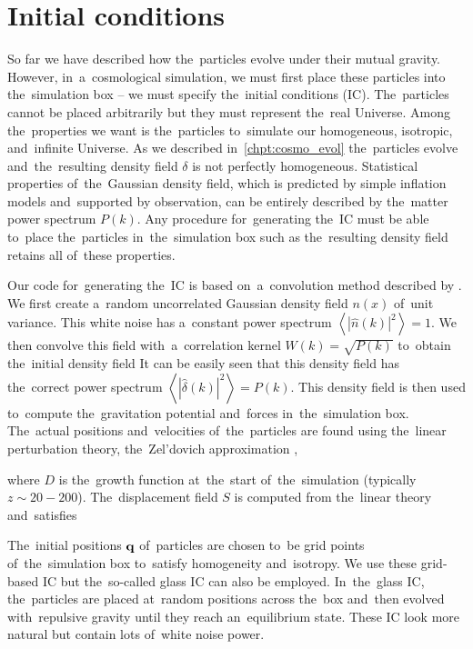 \section{Initial conditions}
So far we have described how the~particles evolve under their mutual gravity. However, in~a~cosmological simulation, we must first place these particles into the~simulation box -- we must specify the~initial conditions (IC). The~particles cannot be placed arbitrarily but they must represent the~real Universe. Among the~properties we want is the~particles to~simulate our homogeneous, isotropic, and~infinite Universe. As we described in~\autoref{chpt:cosmo_evol} the~particles evolve and~the~resulting density field $\delta$ is not perfectly homogeneous. Statistical properties of~the~Gaussian density field, which is predicted by simple inflation models and~supported by observation, can be entirely described by the~matter power spectrum $P(k)$. Any procedure for~generating the~IC must be able to~place the~particles in~the~simulation box such as the~resulting density field retains all of~these properties.

Our code for~generating the~IC is based on~a~convolution method described by \textcite{1997ApJ...490L.127P}. We first create a~random uncorrelated Gaussian density field $n(x)$ of~unit variance. This white noise has a~constant power spectrum $\left\langle|\hat n(k)|^2\right\rangle=1$. We then convolve this field with~a~correlation kernel $W(k)=\sqrt{P(k)}$ to~obtain the~initial  density field
It can be easily seen that this density field has the~correct power spectrum $\left\langle|\hat\delta(k)|^2\right\rangle=P(k)$. This density field is then used to~compute the~gravitation potential and~forces in~the~simulation box. The~actual positions and~velocities of~the~particles are found using the~linear perturbation theory, the~Zel'dovich approximation \parencite{1970A&A.....5...84Z},
\begin{sloppypar}
where $D$ is the~growth function at~the~start of~the~simulation (typically ${z\sim20-200}$). The~displacement field $S$ is computed from the~linear theory and~satisfies
\end{sloppypar}
The~initial positions $\mathbf q$ of~particles are chosen to~be grid points of~the~simulation box to~satisfy homogeneity and~isotropy. We use these grid-based IC but the~so-called glass IC can also be employed. In~the~glass IC, the~particles are placed at~random positions across the~box and~then evolved with~repulsive gravity until they reach an~equilibrium state. These IC look more natural but contain lots of~white noise power.

